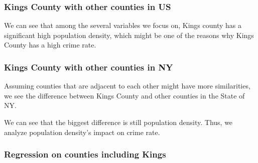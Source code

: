 \documentclass{beamer}
\begin{document}
\begin{frame}[fragile]
\frametitle{Kings County with other counties in US}
We can see that among the several variables we focus on, Kings county has a significant high population density, which might be one of the reasons why Kings County has a high crime rate.
\begin{center}
\end{center}
\end{frame}

\begin{frame}[fragile]
\frametitle{Kings County with other counties in NY}
Assuming counties that are adjacent to each other might have more similarities, we see the difference between Kings County and other counties in the State of NY.
\begin{center}
\end{center}
We can see that the biggest difference is still population density. Thus, we analyze population density's impact on crime rate.
\end{frame}


\begin{frame}[fragile]
\frametitle{Regression on counties including Kings}
\begin{center}
\end{center}
\end{frame}
\end{document}
